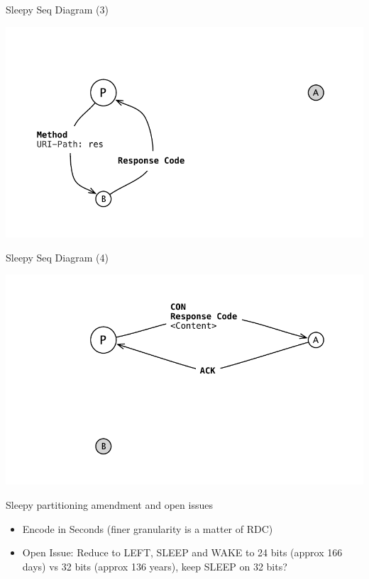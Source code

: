 \documentclass{beamer}
\begin{document}
\begin{frame}{Sleepy Seq Diagram (3)}
 \begin{center}
  \includegraphics[width=\textwidth]{../../share/images/sleepy3.pdf}
 \end{center}
\end{frame}

\begin{frame}{Sleepy Seq Diagram (4)}
 \begin{center}
  \includegraphics[width=\textwidth]{../../share/images/sleepy4.pdf}
 \end{center}
\end{frame}

\begin{frame}{Sleepy partitioning amendment and open issues}

\begin{itemize}
 \item Encode in Seconds (finer granularity is a matter of RDC)
 \item Open Issue: Reduce to LEFT, SLEEP and WAKE to 24 bits (approx 166 days) vs 32 bits (approx 136 years), keep SLEEP on 32 bits?
\end{itemize}


\end{frame}
\end{document}
